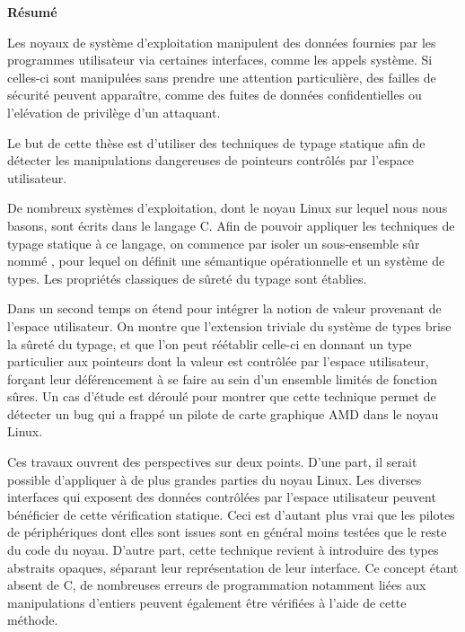 \begin{headingpage}
\thispagestyle{empty}

\begin{center}\Large \textbf{Résumé}\end{center}

Les noyaux de système d'exploitation manipulent des données fournies par
les programmes utilisateur via certaines interfaces, comme les appels système.
Si celles-ci sont manipulées sans prendre une attention particulière, des
failles de sécurité peuvent apparaître, comme des fuites de données
confidentielles ou l'elévation de privilège d'un attaquant.

Le but de cette thèse est d'utiliser des techniques de typage statique afin de
détecter les manipulations dangereuses de pointeurs contrôlés par l'espace
utilisateur.

De nombreux systèmes d'exploitation, dont le noyau Linux sur lequel nous nous
basons, sont écrits dans le langage C. Afin de pouvoir appliquer les techniques
de typage statique à ce langage, on commence par isoler un sous-ensemble sûr
nommé \langname, pour lequel on définit une sémantique opérationnelle et un
système de types. Les propriétés classiques de sûreté du typage sont établies.

Dans un second temps on étend \langname pour intégrer la notion de valeur
provenant de l'espace utilisateur. On montre que l'extension triviale du système
de types brise la sûreté du typage, et que l'on peut réétablir celle-ci en
donnant un type particulier aux pointeurs dont la valeur est contrôlée par
l'espace utilisateur, forçant leur déférencement à se faire au sein d'un
ensemble limités de fonction sûres. Un cas d'étude est déroulé pour montrer que
cette technique permet de détecter un bug qui a frappé un pilote de carte
graphique AMD dans le noyau Linux.

Ces travaux ouvrent des perspectives sur deux points. D'une part, il serait
possible d'appliquer à de plus grandes parties du noyau Linux. Les diverses
interfaces qui exposent des données contrôlées par l'espace utilisateur peuvent
bénéficier de cette vérification statique. Ceci est d'autant plus vrai que les
pilotes de périphériques dont elles sont issues sont en général moins testées
que le reste du code du noyau. D'autre part, cette technique revient à
introduire des types abstraits opaques, séparant leur représentation de leur
interface. Ce concept étant absent de C, de nombreuses erreurs de programmation
notamment liées aux manipulations d'entiers peuvent également être vérifiées à
l'aide de cette méthode.


\end{headingpage}
